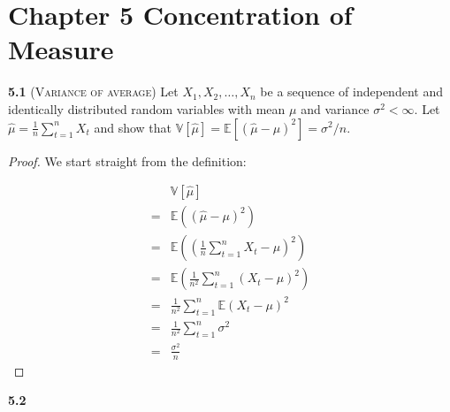 \chapter*{Chapter 5 Concentration of Measure}
\label{sec:5}

\noindent\textbf{5.1}
(\textsc{Variance of average})
Let $X_{1}, X_{2}, \ldots, X_{n}$ be a sequence of independent and identically distributed random variables with mean $\mu$ and variance $\sigma^{2}<\infty$.
Let $\hat{\mu}=\frac{1}{n} \sum_{t=1}^{n} X_{t}$ and show that $\mathbb{V}[\hat{\mu}]=\mathbb{E}\left[(\hat{\mu}-\mu)^{2}\right]=\sigma^{2} / n$.

\begin{proof}
	We start straight from the definition:

	\begin{equation*}
		\begin{aligned}
		&\mathbb{V}[\hat{\mu}]\\
		= &\mathbb{E}((\hat{\mu }-\mu)^2)\\
		= &\mathbb{E}((\frac{1}{n}\sum_{t=1}^{n}{X_t}-\mu)^2)\\
		= &\mathbb{E}(\frac{1}{n^2}\sum_{t=1}^{n}{(X_t - \mu)^2})\\
		= &\frac{1}{n^2}\sum_{t=1}^{n}{\mathbb{E}(X_t - \mu)^2}\\
		= &\frac{1}{n^2}\sum_{t=1}^{n}{\sigma^2}\\
		= &\frac{\sigma^2}{n}
		\end{aligned}
	\end{equation*}			

\end{proof}

\noindent\textbf{5.2}



